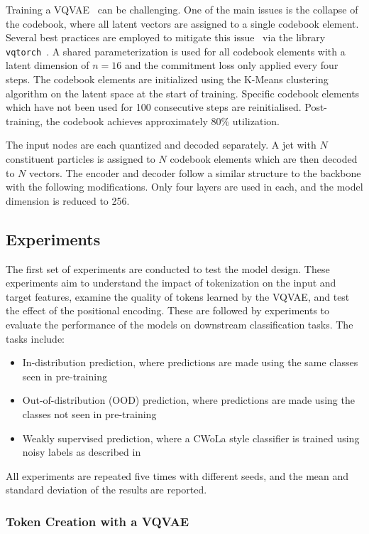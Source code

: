 Training a VQVAE~\cite{VQVAE} can be challenging.
One of the main issues is the collapse of the codebook, where all latent vectors are assigned to a single codebook element.
Several best practices are employed to mitigate this issue~\cite{bettervqvae} via the library \texttt{vqtorch}~\cite{VQTorch}.
A shared parameterization is used for all codebook elements with a latent dimension of $n=16$ and the commitment loss only applied every four steps.
The codebook elements are initialized using the K-Means clustering algorithm on the latent space at the start of training.
Specific codebook elements which have not been used for 100 consecutive steps are reinitialised.
Post-training, the codebook achieves approximately 80\% utilization.

The input nodes are each quantized and decoded separately.
A jet with $N$ constituent particles is assigned to $N$ codebook elements which are then decoded to $N$ vectors.
The encoder and decoder follow a similar structure to the backbone with the following modifications.
Only four layers are used in each, and the model dimension is reduced to 256.

\subsection{Experiments}

The first set of experiments are conducted to test the model design.
These experiments aim to understand the impact of tokenization on the input and target features, examine the quality of tokens learned by the VQVAE, and test the effect of the positional encoding.
These are followed by experiments to evaluate the performance of the models on downstream classification tasks.
The tasks include:
\begin{itemize}
    \item In-distribution prediction, where predictions are made using the same classes seen in pre-training
    \item Out-of-distribution (OOD) prediction, where predictions are made using the classes not seen in pre-training
    \item Weakly supervised prediction, where a CWoLa style classifier is trained using noisy labels as described in 
\end{itemize}
All experiments are repeated five times with different seeds, and the mean and standard deviation of the results are reported.

\subsubsection{Token Creation with a VQVAE}

